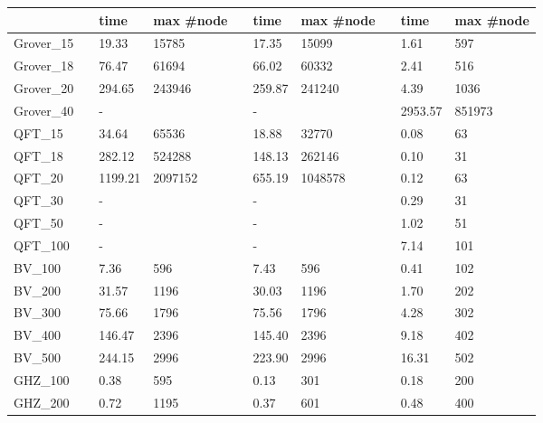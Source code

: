 \documentclass{article}
\begin{document}
\begin{itemize}[leftmargin=*]
\begin{itemize}
\begin{table}[!htbp]
{\begin{tabular}{llllllllll}
                                           &  & time        & max \#node       &  & time          & max \#node        &  & time           & max \#node          \\ \hline
                Grover\_15 &   & 19.33  & 15785     &   & 17.35      & 15099  & & 1.61 & 597  \\
                Grover\_18 &   & 76.47  & 61694     &   & 66.02      & 60332  & & 2.41 & 516  \\
                Grover\_20 &   & 294.65 & 243946    &   & 259.87     & 241240 & & 4.39  & 1036 \\ 
                Grover\_40 &   & -      &           &   & -          &        & & 2953.57 & 851973 \\
                \hline
                QFT\_15     &  & 34.64   & 65536   &  & 18.88  & 32770   &  & 0.08 & 63  \\
                QFT\_18     &  & 282.12  & 524288  &  & 148.13 & 262146 &   & 0.10  & 31  \\
                QFT\_20     &  & 1199.21 & 2097152 &  & 655.19 & 1048578 &  & 0.12 & 63  \\
                QFT\_30     &  & -       &         &  & -      &        &  & 0.29 & 31  \\
                QFT\_50     &  & -       &         &  & -      &        &  & 1.02 & 51  \\
                QFT\_100    &  & -       &         &  & -      &        &  & 7.14 & 101 \\
                \hline
                BV\_100     &  & 7.36    & 596     &  & 7.43      & 596     &  & 0.41           & 102 \\
                BV\_200     &  & 31.57   & 1196    &  & 30.03     & 1196    &  & 1.70           & 202 \\
                BV\_300     &  & 75.66   & 1796    &  & 75.56     & 1796    &  & 4.28           & 302 \\
                BV\_400     &  & 146.47  & 2396    &  & 145.40    & 2396    &  & 9.18           & 402 \\
                BV\_500     &  & 244.15  & 2996    &  & 223.90    & 2996    &  & 16.31          & 502 \\
                \hline
                GHZ\_100    &  & 0.38    & 595     &  & 0.13      & 301    &  & 0.18           & 200 \\%
                GHZ\_200    &  & 0.72    & 1195    &  & 0.37      & 601    &  & 0.48           & 400 \\%

\end{tabular}}
\end{table}
\end{itemize}
\end{itemize}
\end{document}
